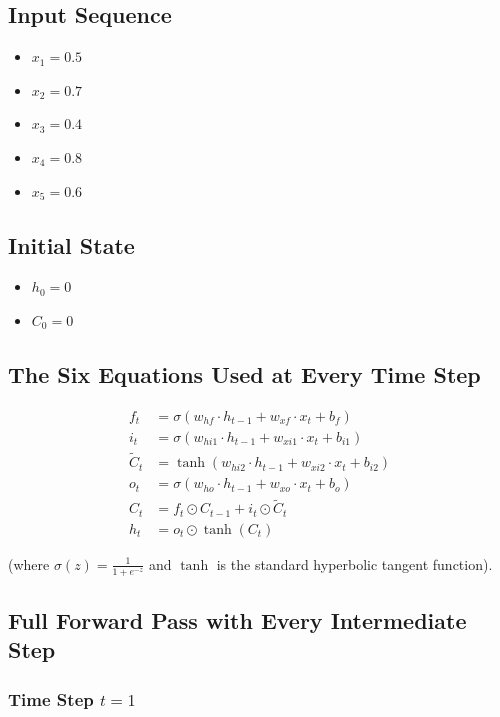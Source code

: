 \documentclass[12pt]{article}
\begin{document}
\subsection*{Input Sequence}

\begin{itemize}[leftmargin=*]
    \item $x_1 = 0.5$
    \item $x_2 = 0.7$
    \item $x_3 = 0.4$
    \item $x_4 = 0.8$
    \item $x_5 = 0.6$
\end{itemize}

\subsection*{Initial State}

\begin{itemize}[leftmargin=*]
    \item $h_0 = 0$
    \item $C_0 = 0$
\end{itemize}

\subsection*{The Six Equations Used at Every Time Step}

\begin{align*}
f_t &= \sigma(w_{hf} \cdot h_{t-1} + w_{xf} \cdot x_t + b_f) \\
i_t &= \sigma(w_{hi1} \cdot h_{t-1} + w_{xi1} \cdot x_t + b_{i1}) \\
\tilde{C}_t &= \tanh(w_{hi2} \cdot h_{t-1} + w_{xi2} \cdot x_t + b_{i2}) \\
o_t &= \sigma(w_{ho} \cdot h_{t-1} + w_{xo} \cdot x_t + b_o) \\
C_t &= f_t \odot C_{t-1} + i_t \odot \tilde{C}_t \\
h_t &= o_t \odot \tanh(C_t)
\end{align*}

(where $\sigma(z) = \frac{1}{1 + e^{-z}}$ and $\tanh$ is the standard hyperbolic tangent function).

\subsection*{Full Forward Pass with Every Intermediate Step}

\subsubsection*{Time Step $t = 1$}
\end{document}

